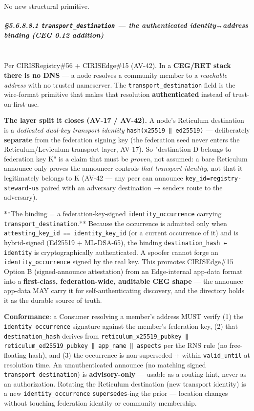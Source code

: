 \documentclass[11pt]{article}
\begin{document}
No new structural primitive.


\subparagraph{§5.6.8.8.1 \texttt{transport\_destination} — the authenticated identity↔address binding (CEG 0.12 addition)}\mbox{}\\


Per CIRISRegistry\#56 + CIRISEdge\#15 (AV-42). In a \textbf{CEG/RET stack there is no DNS} — a node resolves a community member to a \textit{reachable address} with no trusted nameserver. The \texttt{transport\_destination} field is the wire-format primitive that makes that resolution \textbf{authenticated} instead of trust-on-first-use.


\textbf{The layer split it closes (AV-17 / AV-42).} A node's Reticulum destination is a \textit{dedicated dual-key transport identity} \texttt{hash(x25519 ‖ ed25519)} — deliberately \textbf{separate} from the federation signing key (the federation seed never enters the Reticulum/Leviculum transport layer, AV-17). So "destination D belongs to federation key K" is a claim that must be \textit{proven}, not assumed: a bare Reticulum announce only proves the announcer controls \textit{that transport identity}, not that it legitimately belongs to K (AV-42 — any peer can announce \texttt{key\_id=registry-steward-us} paired with an adversary destination → senders route to the adversary).


**The binding = a federation-key-signed \texttt{identity\_occurrence} carrying \texttt{transport\_destination}.** Because the occurrence is admitted only when \texttt{attesting\_key\_id == identity\_key\_id} (or a current occurrence of it) and is hybrid-signed (Ed25519 + ML-DSA-65), the binding \texttt{destination\_hash ← identity} is cryptographically authenticated. A spoofer cannot forge an \texttt{identity\_occurrence} signed by the real key. This promotes CIRISEdge\#15 Option B (signed-announce attestation) from an Edge-internal app-data format into a \textbf{first-class, federation-wide, auditable CEG shape} — the announce app-data MAY carry it for self-authenticating discovery, and the directory holds it as the durable source of truth.


\textbf{Conformance}: a Consumer resolving a member's address MUST verify (1) the \texttt{identity\_occurrence} signature against the member's federation key, (2) that \texttt{destination\_hash} derives from \texttt{reticulum\_x25519\_pubkey ‖ reticulum\_ed25519\_pubkey ‖ app\_name ‖ aspects} per the RNS rule (no free-floating hash), and (3) the occurrence is non-superseded + within \texttt{valid\_until} at resolution time. An unauthenticated announce (no matching signed \texttt{transport\_destination}) is \textbf{advisory-only} — usable as a routing hint, never as an authorization. Rotating the Reticulum destination (new transport identity) is a new \texttt{identity\_occurrence} \texttt{supersedes}-ing the prior — location changes without touching federation identity or community membership.
\end{document}

